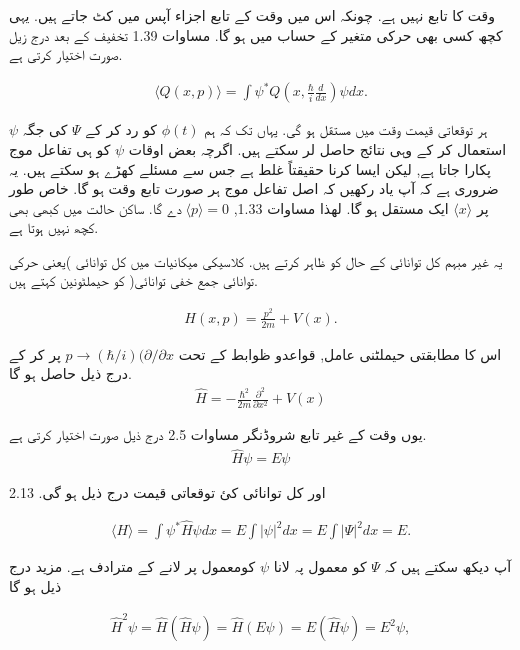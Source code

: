 وقت کا تابع نہیں ہے. چونکہ اس میں وقت کے تابع اجزاء آپس میں کٹ جاتے ہیں. یہی کچھ کسی بھی حرکی متغیر کے حساب میں ہو گا. مساوات 1.39 تخفیف کے بعد درج زیل صورت اختیار کرتی ہے. 

\begin{align}
\langle Q(x,p) \rangle = \int \psi^{*} Q \left( x, \frac{\hbar}{i} \frac{d}{dx} \right) \psi dx.
\end{align}


ہر توقعاتی قیمت وقت میں مستقل ہو گی. یہاں تک کہ ہم \( \phi (t) \) کو رد کر کے \( \Psi \) کی جگہ \( \psi \) استعمال کر کے وہی نتائج حاصل لر سکتے ہیں. اگرچہ بعض اوقات  \( \psi \)  کو ہی تفاعل موج پکارا جاتا ہے, لیکن ایسا کرنا حقیقتاً غلط ہے جس سے مسئلے کھڑے ہو سکتے ہیں. یہ ضروری ہے کہ آپ یاد رکھیں کہ اصل تفاعل موج ہر صورت تابع وقت ہو گا. خاص طور پر \( \langle x \rangle \) ایک مستقل  ہو گا. لھذا مساوات 1.33, \( \langle p \rangle = 0 \) دے گا. ساکن حالت میں کبھی بھی کچھ نہیں ہوتا ہے. 

یہ غیر مبہم کل توانائی کے حال کو ظاہر کرتے ہیں. کلاسیکی میکانیات میں کل توانائی )یعنی حرکی توانائی جمع خفی  توانائی( کو حیملٹونین کہتے ہیں. 

\begin{align}
H (x,p) = \frac{p^{2}}{2m} + V(x).
\end{align}


اس کا مطابقتی حیملٹنی عامل, قواعدو ظوابط کے تحت \( p \rightarrow (\hbar/i)(\partial/\partial x \)  پر کر کے درج ذیل حاصل ہو گا. 
\begin{align}
\hat{H} = - \frac{\hbar^{2}}{2m} \frac{\partial^{2}}{\partial x^{2}} + V(x) 
\end{align}

یوں وقت کے غیر تابع شروڈنگر مساوات 2.5 درج ذیل صورت اختیار کرتی ہے. 
\begin{align}
\hat{H} \psi = E\psi
\end{align}

اور کل توانائی کئ توقعاتی قیمت درج ذیل ہو گی. 
2.13 

\begin{align}
\langle H \rangle = \int \psi^{*} \hat{H}\psi dx = E \int \left| \psi \right|^{2} dx = E \int \left| \Psi \right|^{2} dx = E.
\end{align}

آپ دیکھ سکتے ہیں کہ \( \Psi \) کو معمول پہ لانا \( \psi \) کومعمول پر لانے کے مترادف ہے. مزید درج ذیل ہو گا

\begin{align*}
\hat{H}^{2} \psi = \hat{H} (\hat{H}\psi ) = \hat{H} ( E\psi ) = E (\hat{H} \psi ) = E^{2} \psi ,
\end{align*}

